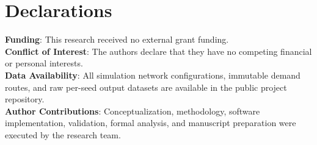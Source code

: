 \documentclass[11pt,journal,onecolumn]{article}
\begin{document}
\section*{Declarations}
\textbf{Funding}: This research received no external grant funding.\\
\textbf{Conflict of Interest}: The authors declare that they have no competing financial or personal interests.\\
\textbf{Data Availability}: All simulation network configurations, immutable demand routes, and raw per-seed output datasets are available in the public project repository.\\
\textbf{Author Contributions}: Conceptualization, methodology, software implementation, validation, formal analysis, and manuscript preparation were executed by the research team.
\end{document}
